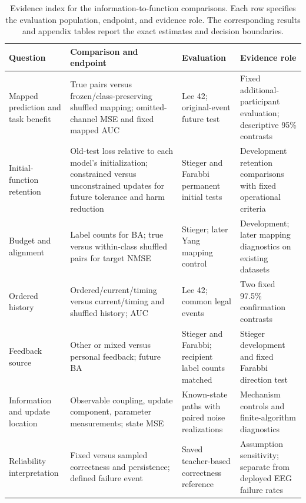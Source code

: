 \documentclass[11pt,a4paper]{article}
\begin{document}
\begin{table}[tbp]
\centering\small
\caption{Evidence index for the information-to-function comparisons. Each row specifies the evaluation population, endpoint, and evidence role. The corresponding results and appendix tables report the exact estimates and decision boundaries.}
\label{tab:contrasts}
\begin{tabularx}{\linewidth}{@{}>{\raggedright\arraybackslash}p{.17\linewidth}>{\raggedright\arraybackslash}p{.28\linewidth}>{\raggedright\arraybackslash}p{.25\linewidth}>{\raggedright\arraybackslash}X@{}}
\toprule
Question & Comparison and endpoint & Evaluation & Evidence role\\
\midrule
Mapped prediction and task benefit & True pairs versus frozen/class-preserving shuffled mapping; omitted-channel MSE and fixed mapped AUC & Lee 42; original-event future test & Fixed additional-participant evaluation; descriptive 95\% contrasts\\
\addlinespace
Initial-function retention & Old-test loss relative to each model's initialization; constrained versus unconstrained updates for future tolerance and harm reduction & Stieger and Farabbi permanent initial tests & Development retention comparisons with fixed operational criteria\\
\addlinespace
Budget and alignment & Label counts for BA; true versus within-class shuffled pairs for target NMSE & Stieger; later Yang mapping control & Development; later mapping diagnostics on existing datasets\\
\addlinespace
Ordered history & Ordered/current/timing versus current/timing and shuffled history; AUC & Lee 42; common legal events & Two fixed 97.5\% confirmation contrasts\\
\addlinespace
Feedback source & Other or mixed versus personal feedback; future BA & Stieger and Farabbi; recipient label counts matched & Stieger development and fixed Farabbi direction test\\
\addlinespace
Information and update location & Observable coupling, update component, parameter measurements; state MSE & Known-state paths with paired noise realizations & Mechanism controls and finite-algorithm diagnostics\\
\addlinespace
Reliability interpretation & Fixed versus sampled correctness and persistence; defined failure event & Saved teacher-based correctness reference & Assumption sensitivity; separate from deployed EEG failure rates\\
\bottomrule
\end{tabularx}
\end{table}
\end{document}
